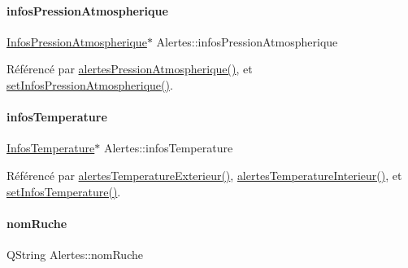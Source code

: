 \mbox{\label{class_alertes_af4bfb245d72bc2eb080df844aa50ac86}} 
\paragraph{\texorpdfstring{infos\+Pression\+Atmospherique}{infosPressionAtmospherique}}
{\footnotesize\ttfamily \hyperlink{class_infos_pression_atmospherique}{Infos\+Pression\+Atmospherique}$\ast$ Alertes\+::infos\+Pression\+Atmospherique\hspace{0.3cm}{\ttfamily [private]}}



Référencé par \hyperlink{class_alertes_ab8a33e82cdd4d4e0560c9ba6e10ca8d5}{alertes\+Pression\+Atmospherique()}, et \hyperlink{class_alertes_a771133f26d4ab8c90d1bdf50e1d23d87}{set\+Infos\+Pression\+Atmospherique()}.

\mbox{\label{class_alertes_ad02b203545812ad6408befecc94ee0ec}} 
\paragraph{\texorpdfstring{infos\+Temperature}{infosTemperature}}
{\footnotesize\ttfamily \hyperlink{class_infos_temperature}{Infos\+Temperature}$\ast$ Alertes\+::infos\+Temperature\hspace{0.3cm}{\ttfamily [private]}}



Référencé par \hyperlink{class_alertes_a91fb2665fa8b6c32c74bfe4d1b89a2d8}{alertes\+Temperature\+Exterieur()}, \hyperlink{class_alertes_a8bc56cf9eb525624b2c1f5b20f86724b}{alertes\+Temperature\+Interieur()}, et \hyperlink{class_alertes_a091a0fabca5b06302bc19de31aecafff}{set\+Infos\+Temperature()}.

\mbox{\label{class_alertes_a212f2a7185bcc7b11f3e54200272bdcf}} 
\paragraph{\texorpdfstring{nom\+Ruche}{nomRuche}}
{\footnotesize\ttfamily Q\+String Alertes\+::nom\+Ruche\hspace{0.3cm}{\ttfamily [private]}}



